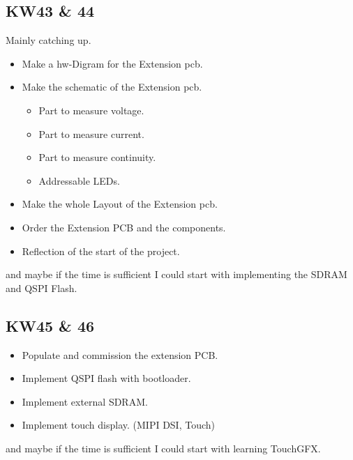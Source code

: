 \subsection{KW43 \& 44}
Mainly catching up.
\begin{itemize}
    \item Make a \acs{hw}-Digram for the Extension \acs{pcb}.
    \item Make the schematic of the Extension \acs{pcb}. 
    \begin{itemize}
        \item Part to measure voltage.
        \item Part to measure current.
        \item Part to measure continuity.
        \item Addressable LEDs.
    \end{itemize}
    \item Make the whole Layout of the Extension \acs{pcb}.
    \item Order the Extension PCB and the components.
    \item Reflection of the start of the project.
\end{itemize}
and maybe if the time is sufficient I could start with implementing the SDRAM and QSPI Flash.



\subsection{KW45 \& 46}
\begin{itemize}
  \item Populate and commission the extension PCB.
  \item Implement QSPI flash with bootloader.
  \item Implement external SDRAM.
  \item Implement touch display. (MIPI DSI, Touch)
\end{itemize}
and maybe if the time is sufficient I could start with learning TouchGFX.

\newpage



